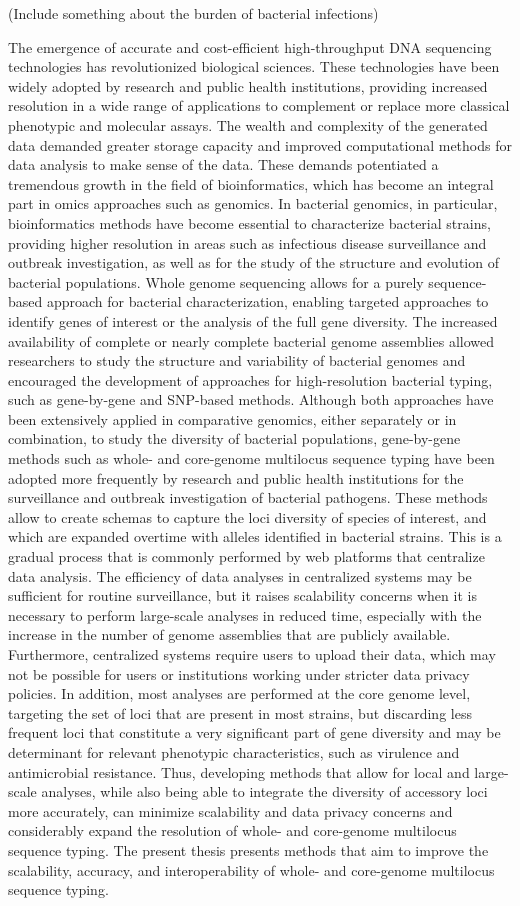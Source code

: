 
(Include something about the burden of bacterial infections)

The emergence of accurate and cost-efficient high-throughput DNA sequencing technologies has revolutionized biological sciences. These technologies have been widely adopted by research and public health institutions, providing increased resolution in a wide range of applications to complement or replace more classical phenotypic and molecular assays. The wealth and complexity of the generated data demanded greater storage capacity and improved computational methods for data analysis to make sense of the data. These demands potentiated a tremendous growth in the field of bioinformatics, which has become an integral part in omics approaches such as genomics. In bacterial genomics, in particular, bioinformatics methods have become essential to characterize bacterial strains, providing higher resolution in areas such as infectious disease surveillance and outbreak investigation, as well as for the study of the structure and evolution of bacterial populations. Whole genome sequencing allows for a purely sequence-based approach for bacterial characterization, enabling targeted approaches to identify genes of interest or the analysis of the full gene diversity. The increased availability of complete or nearly complete bacterial genome assemblies allowed researchers to study the structure and variability of bacterial genomes and encouraged the development of approaches for high-resolution bacterial typing, such as gene-by-gene and SNP-based methods. Although both approaches have been extensively applied in comparative genomics, either separately or in combination, to study the diversity of bacterial populations, gene-by-gene methods such as whole- and core-genome multilocus sequence typing have been adopted more frequently by research and public health institutions for the surveillance and outbreak investigation of bacterial pathogens. These methods allow to create schemas to capture the loci diversity of species of interest, and which are expanded overtime with alleles identified in bacterial strains. This is a gradual process that is commonly performed by web platforms that centralize data analysis. The efficiency of data analyses in centralized systems may be sufficient for routine surveillance, but it raises scalability concerns when it is necessary to perform large-scale analyses in reduced time, especially with the increase in the number of genome assemblies that are publicly available. Furthermore, centralized systems require users to upload their data, which may not be possible for users or institutions working under stricter data privacy policies. In addition, most analyses are performed at the core genome level, targeting the set of loci that are present in most strains, but discarding less frequent loci that constitute a very significant part of gene diversity and may be determinant for relevant phenotypic characteristics, such as virulence and antimicrobial resistance. Thus, developing methods that allow for local and large-scale analyses, while also being able to integrate the diversity of accessory loci more accurately, can minimize scalability and data privacy concerns and considerably expand the resolution of whole- and core-genome multilocus sequence typing. The present thesis presents methods that aim to improve the scalability, accuracy, and interoperability of whole- and core-genome multilocus sequence typing.



